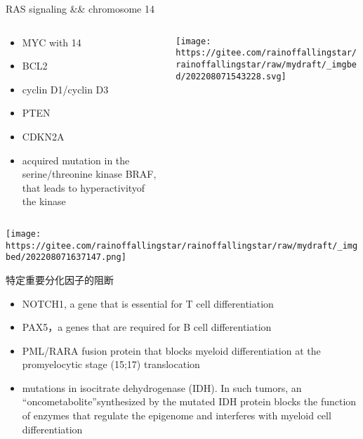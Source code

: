 \documentclass[
  ignorenonframetext,
]{beamer}
\begin{document}
\begin{frame}
\begin{block}{RAS signaling \&\& chromosome 14}
\protect\hypertarget{ras-signaling-chromosome-14}{}
\begin{columns}[T]
\begin{column}{0.4\textwidth}
\begin{itemize}
\item
  MYC with 14
\item
  BCL2
\item
  cyclin D1/cyclin D3
\item
  PTEN
\item
  CDKN2A
\item
  acquired mutation in the serine/threonine kinase BRAF, that leads to
  hyperactivityof the kinase
\end{itemize}
\end{column}

\begin{column}{0.6\textwidth}
\texttt{[image: https://gitee.com/rainoffallingstar/rainoffallingstar/raw/mydraft/\_imgbed/202208071543228.svg]}
\end{column}
\end{columns}
\end{block}
\end{frame}

\begin{frame}
\texttt{[image: https://gitee.com/rainoffallingstar/rainoffallingstar/raw/mydraft/\_imgbed/202208071637147.png]}
\end{frame}

\begin{frame}
\begin{block}{特定重要分化因子的阻断}
\protect\hypertarget{ux7279ux5b9aux91cdux8981ux5206ux5316ux56e0ux5b50ux7684ux963bux65ad}{}
\begin{itemize}
\item
  NOTCH1, a gene that is essential for T cell differentiation
\item
  PAX5，a genes that are required for B cell differentiation
\item
  PML/RARA fusion protein that blocks myeloid differentiation at the
  promyelocytic stage (15;17) translocation
\item
  mutations in isocitrate dehydrogenase (IDH). In such tumors, an
  ``oncometabolite''synthesized by the mutated IDH protein blocks the
  function of enzymes that regulate the epigenome and interferes with
  myeloid cell differentiation
\end{itemize}
\end{block}
\end{frame}
\end{document}
